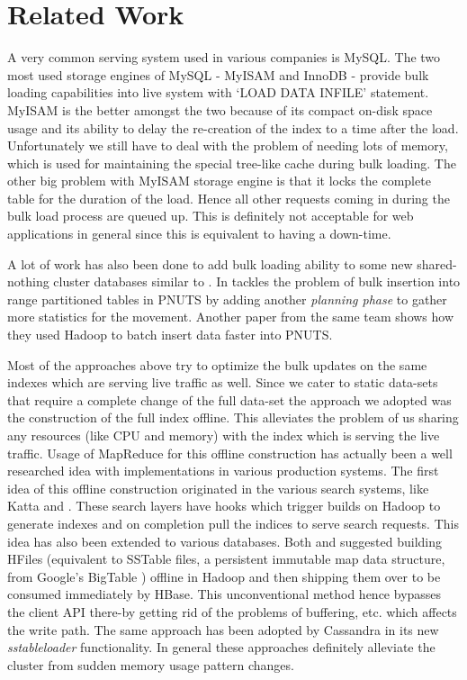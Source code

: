 \section{Related Work}
\label{sec:related_work}
A very common serving system used in various companies is MySQL. The two most used storage engines of MySQL - MyISAM and InnoDB - provide bulk loading capabilities into live system with `LOAD DATA INFILE' statement. MyISAM is the better amongst the two because of its compact on-disk space usage and its ability to delay the re-creation of the index to a time after the load\cite{bulk}.  Unfortunately we still have to deal with the problem of needing lots of memory, which is used for maintaining the special tree-like cache during bulk loading. 
The other big problem with MyISAM storage engine is that it locks the complete table for the duration of the load. Hence all other requests coming in during the bulk load process are queued up. This is definitely not acceptable for web applications in general since this is equivalent to having a down-time.  

A lot of work has also been done to add bulk loading ability to some new shared-nothing cluster\cite{sharednothing} databases similar to \projectname{}. In \cite{silberstein} tackles the problem of bulk insertion into range partitioned tables in PNUTS \cite{pnuts} by adding another \emph {planning phase} to gather more statistics for the movement. Another paper from the same team \cite{pnutsbatch} shows how they used Hadoop to batch insert data faster into PNUTS.

Most of the approaches above try to optimize the bulk updates on the same indexes which are serving live traffic as well. Since we cater to static data-sets that require a complete change of the full data-set the approach we adopted was the construction of the full index offline. This alleviates the problem of us sharing any resources (like CPU and memory) with the index which is serving the live traffic. Usage of MapReduce for this offline construction has actually been a well researched idea with implementations in various production systems. The first idea of this offline construction originated in the various search systems, like Katta\cite{katta} and \cite{mika}. These search layers have hooks which trigger builds on Hadoop to generate indexes and on completion pull the indices to serve search requests. This idea has also been extended to various databases. Both \cite{konstantinou} and \cite{barbuzzi} suggested building HFiles (equivalent to SSTable files, a persistent immutable map data structure, from Google's BigTable \cite{bigtable}) offline in Hadoop and then shipping them over to be consumed immediately by HBase\cite{hbase}. This unconventional method hence bypasses the client API there-by getting rid of the problems of buffering, etc. which affects the write path. The same approach has been adopted by Cassandra\cite{cassandra} in its new \emph{sstableloader}\cite{cassandra_bulk} functionality. In general these approaches definitely alleviate the cluster from sudden memory usage pattern changes. 

